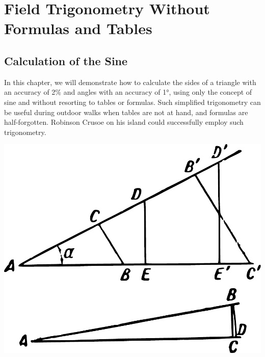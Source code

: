 

\chapter{Field Trigonometry Without Formulas and Tables}
\label{ch-05}
	
\section{Calculation of the Sine}
\label{sec-5.1}

In this chapter, we will demonstrate how to calculate the sides of a triangle with an accuracy of 2\% and angles with an accuracy of \ang{1}, using only the concept of sine and without resorting to tables or formulas. Such simplified trigonometry can be useful during outdoor walks when tables are not at hand, and formulas are half-forgotten. Robinson Crusoe on his island could successfully employ such trigonometry.
\begin{marginfigure}%
\centering
\includegraphics[width=\textwidth]{figures/ch-05/fig-088.pdf}
\end{marginfigure}

